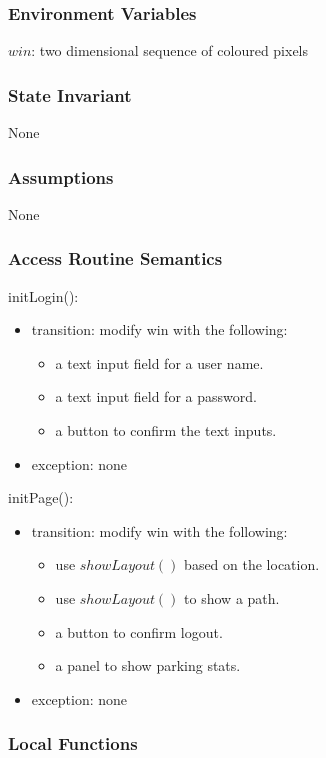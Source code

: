 \documentclass[12pt, titlepage]{article}
\begin{document}
\subsubsection{Environment Variables}
$win$: two dimensional sequence of coloured pixels

\subsubsection{State Invariant}
None

\subsubsection{Assumptions}
None

\subsubsection{Access Routine Semantics}

\noindent initLogin():
\begin{itemize} 
\item transition: modify win with the following:
\begin{itemize} 
\item a text input field for a user name.
\item a text input field for a password.
\item a button to confirm the text inputs.
\end{itemize}
\item exception: none
\end{itemize}

\noindent initPage():
\begin{itemize} 
\item transition: modify win with the following:
\begin{itemize} 
\item use $showLayout()$ based on the location.
\item use $showLayout()$ to show a path.
\item a button to confirm logout.
\item a panel to show parking stats.
\end{itemize}
\item exception: none
\end{itemize}

\subsubsection{Local Functions}
\end{document}
